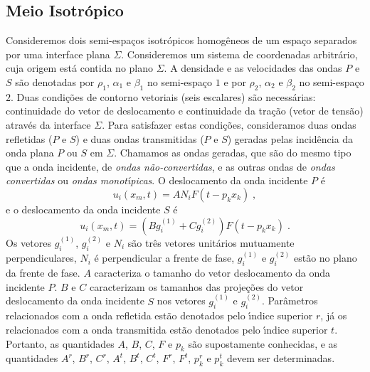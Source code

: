 \subsection{Meio Isotr\'opico} \label{meioisotr}

Consideremos dois semi-espa\c{c}os isotr\'opicos homog\^eneos de
um espa\c{c}o separados por uma interface plana $\Sigma$.
Consideremos um sistema de coordenadas arbitr\'ario, cuja origem
est\'a contida no plano $\Sigma$. A densidade e as velocidades das
ondas $P$ e $S$ s\~ao denotadas por $\rho_1$, $\alpha_1$ e
$\beta_1$ no semi-espa\c{c}o $1$ e por $\rho_2$, $\alpha_2$ e
$\beta_2$ no semi-espa\c{c}o $2$. Duas condi\c{c}\~oes de contorno
vetoriais (seis escalares) s\~ao necess\'arias: continuidade do
vetor de deslocamento e continuidade da tra\c{c}\~ao (vetor de
tens\~ao) atrav\'es da interface $\Sigma$. Para satisfazer estas
condi\c{c}\~oes, consideramos duas ondas refletidas ($P$ e $S$) e
duas ondas transmitidas ($P$ e $S$) geradas pelas incid\^encia da
onda plana $P$ ou $S$ em $\Sigma$. Chamamos as ondas geradas, que
s\~ao do mesmo tipo que a onda incidente, de {\it ondas
n\~ao-convertidas}, e as outras ondas de {\it ondas convertidas}
ou {\it ondas monot\'{\i}picas}. O deslocamento da onda incidente
$P$ \'e
\begin{equation}
u_i(x_m,t)=AN_iF(t-p_kx_k) \;,
\end{equation}
e o deslocamento da onda incidente $S$ \'e
\begin{equation}
u_i(x_m,t)=(Bg_i^{(1)}+Cg_i^{(2)})F(t-p_kx_k) \;.
\end{equation}
Os vetores $g_i^{(1)}$, $g_i^{(2)}$ e $N_i$ s\~ao tr\^es vetores
unit\'arios mutuamente perpendiculares, $N_i$ \'e perpendicular a
frente de fase, $g_i^{(1)}$ e $g_i^{(2)}$ est\~ao no plano da
frente de fase. $A$ caracteriza o tamanho do vetor deslocamento da
onda incidente $P$. $B$ e $C$ caracterizam os tamanhos das
proje\c{c}\~oes do vetor deslocamento da onda incidente $S$ nos
vetores $g_i^{(1)}$ e $g_i^{(2)}$. Par\^ametros relacionados com a
onda refletida est\~ao denotados pelo \'{\i}ndice superior $r$,
j\'a os relacionados com a onda transmitida est\~ao denotados pelo
\'{\i}ndice superior $t$. Portanto, as quantidades $A$, $B$, $C$,
$F$ e $p_k$ s\~ao supostamente conhecidas, e as quantidades $A^r$,
$B^r$, $C^r$, $A^t$, $B^t$, $C^t$, $F^r$, $F^t$, $p_k^r$ e $p_k^t$
devem ser determinadas.

